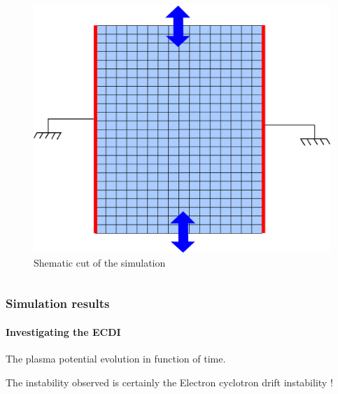\documentclass[sans, aspectratio=169]{beamer}
\begin{document}
\begin{frame}
\begin{columns}
	\begin{column}{0.45\linewidth}
		\begin{figure}[hbtp]
		\centering
		\includegraphics[scale=0.5]{images/2D_Rtheta.png}
		\caption{Shematic cut of the simulation}
		\end{figure}
	
	\end{column}


\end{columns}		
	
	
\end{frame}

\begin{frame} 
	\frametitle{Simulation results} 
	\framesubtitle{ Investigating the ECDI } 

	\begin{center}
	The plasma potential evolution in function of time.\\
	
	
	The instability observed is certainly the Electron cyclotron drift instability !
	\end{center}
\end{frame}
\end{document}
